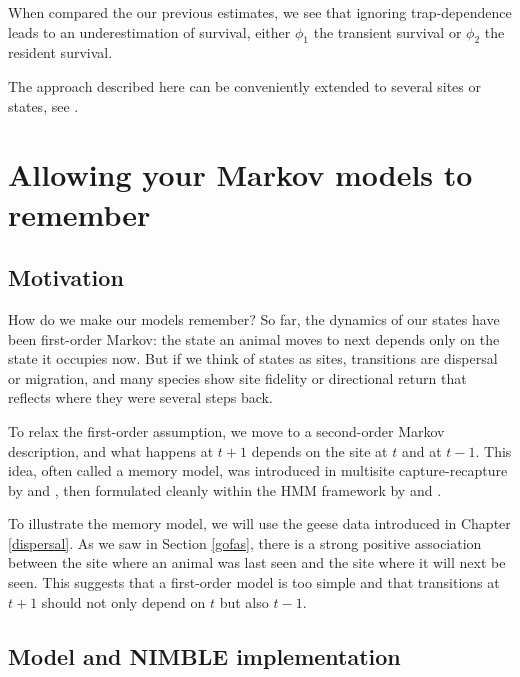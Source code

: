 \documentclass[
  12pt,
]{krantz}
\begin{document}
When compared the our previous estimates, we see that ignoring trap-dependence leads to an underestimation of survival, either \(\phi_1\) the transient survival or \(\phi_{2}\) the resident survival.

The approach described here can be conveniently extended to several sites or states, see \citet{pradeltrapdep2012}.

\section{Allowing your Markov models to remember}\label{memorymodel}

\subsection{Motivation}\label{motivation-4}

How do we make our models remember? So far, the dynamics of our states have been first-order Markov: the state an animal moves to next depends only on the state it occupies now. But if we think of states as sites, transitions are dispersal or migration, and many species show site fidelity or directional return that reflects where they were several steps back.

To relax the first-order assumption, we move to a second-order Markov description, and what happens at \(t+1\) depends on the site at \(t\) and at \(t−1\). This idea, often called a memory model, was introduced in multisite capture-recapture by \citet{hestbeck1991estimates} and \citet{BrownieEtAl1993}, then formulated cleanly within the HMM framework by \citet{pradel_multievent_2005} and \citet{rouan2009memory}.

To illustrate the memory model, we will use the geese data introduced in Chapter \ref{dispersal}. As we saw in Section \ref{gofas}, there is a strong positive association between the site where an animal was last seen and the site where it will next be seen. This suggests that a first-order model is too simple and that transitions at \(t+1\) should not only depend on \(t\) but also \(t-1\).

\subsection{Model and NIMBLE implementation}\label{model-and-nimble-implementation-4}
\end{document}
